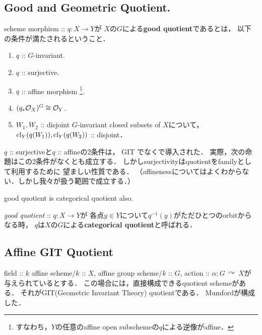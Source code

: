 \documentclass[a4paper]{jsarticle}
\newcommand{\acton}{\,\curvearrowright\,}
\begin{document}
    \subsection{Good and Geometric Quotient.}
    \begin{Def} \label{def:good_quotient}
        scheme morphism :: $q: X \to Y$が
        $X$の$G$による\textbf{good quotient}であるとは，
        以下の条件が満たされるということ．
        \begin{enumerate}[label=(\roman*), leftmargin=*]
        \item $q$ :: $G$-invariant.
        \item $q$ :: surjective.
        \item $q$ :: affine morphism
              \footnote{ すなわち，$Y$の任意のaffine open subschemeの$q$による逆像がaffine． }.
        \item $(q_*\mathcal{O}_X)^G \cong \mathcal{O}_Y$.
        \item
            $W_1, W_2$ :: disjoint $G$-invariant closed subsets of $X$について，
            $\operatorname{cl}_Y(q(W_1)), \operatorname{cl}_Y(q(W_2))$ :: disjoint．
    \end{enumerate}
    \end{Def}
    $q$ :: surjectiveと$q$ :: affineの2条件は，
    GIT \cite{GIT}でなく\cite{Ses}で導入された．
    実際，次の命題はこの2条件がなくとも成立する．
    しかしsurjectivityはquotientをfamilyとして利用するために
    望ましい性質である．
    （affinenessについてはよくわからない．しかし我々が扱う範囲で成立する．）

    \begin{Prop}
        good quotient is categorical quotient also.
    \end{Prop}

    \begin{Def}
        \textit{good quotient} :: $q: X \to Y$が
        各点$y \in Y$について$q^{-1}(y)$がただひとつのorbitからなる時，
        $q$は$X$の$G$による\textbf{categorical quotient}と呼ばれる．
    \end{Def}


    \subsection{Affine GIT Quotient}
    field :: $k$
    affine scheme/$k$ :: $X$,
    affine group scheme/$k$ :: $G$,
    action :: $\alpha: G \acton X$が与えられているとする．
    この場合には，直接構成できるquotient schemeがある．
    それがGIT(Geometric Invariant Theory) quotientである．
    Mumfordが構成した．
    
\end{document}
